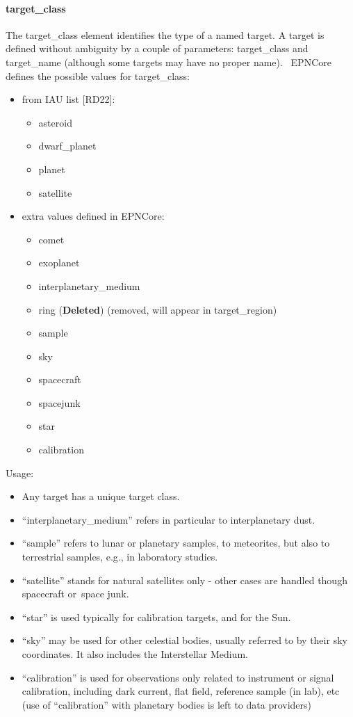 \documentclass[11pt,a4paper]{ivoa}
\begin{document}
\paragraph{target\_class}

The target\_class element identifies the type of a named target. A target is defined without ambiguity by a couple of parameters: target\_class and target\_name (although some targets may have no proper name).  EPNCore defines the possible values for target\_class:

\begin{itemize}
\item from IAU list [RD22]:\begin{itemize}
\item asteroid\\
\item dwarf\_planet
\item planet
\item satellite
\end{itemize}


\item extra values defined in EPNCore:\begin{itemize}
\item comet\\
\item exoplanet
\item interplanetary\_medium
\item ring (\textbf{Deleted}) (removed, will appear in target\_region)
\item sample
\item sky
\item spacecraft
\item spacejunk
\item star
\item calibration
\end{itemize}


\end{itemize}

Usage:

\begin{itemize}
\item Any target has a unique target class.
\item ``interplanetary\_medium'' refers in particular to interplanetary dust.
\item ``sample'' refers to lunar or planetary samples, to meteorites, but also to terrestrial samples, e.g., in laboratory studies.
\item ``satellite'' stands for natural satellites only - other cases are handled though spacecraft or space junk.
\item ``star'' is used typically for calibration targets, and for the Sun.
\item ``sky'' may be used for other celestial bodies, usually referred to by their sky coordinates. It also includes the Interstellar Medium.
\item ``calibration'' is used for observations only related to instrument or signal calibration, including dark current, flat field, reference sample (in lab), etc (use of ``calibration'' with planetary bodies is left to data providers)
\end{itemize}
\end{document}
